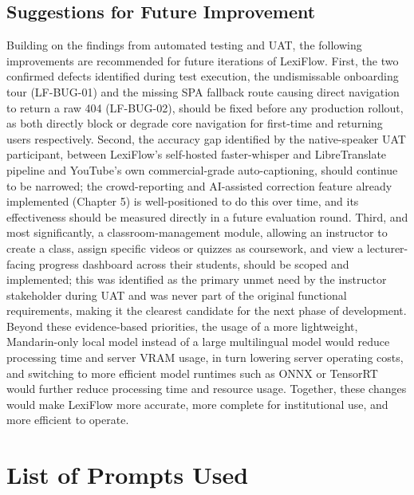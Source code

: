 \documentclass[oneside]{utmthesis}
\begin{document}
\section{Suggestions for Future Improvement}
Building on the findings from automated testing and UAT, the following improvements are recommended for future iterations of LexiFlow. First, the two confirmed defects identified during test execution, the undismissable onboarding tour (LF-BUG-01) and the missing SPA fallback route causing direct navigation to return a raw 404 (LF-BUG-02), should be fixed before any production rollout, as both directly block or degrade core navigation for first-time and returning users respectively. Second, the accuracy gap identified by the native-speaker UAT participant, between LexiFlow's self-hosted faster-whisper and LibreTranslate pipeline and YouTube's own commercial-grade auto-captioning, should continue to be narrowed; the crowd-reporting and AI-assisted correction feature already implemented (Chapter 5) is well-positioned to do this over time, and its effectiveness should be measured directly in a future evaluation round. Third, and most significantly, a classroom-management module, allowing an instructor to create a class, assign specific videos or quizzes as coursework, and view a lecturer-facing progress dashboard across their students, should be scoped and implemented; this was identified as the primary unmet need by the instructor stakeholder during UAT and was never part of the original functional requirements, making it the clearest candidate for the next phase of development. Beyond these evidence-based priorities, the usage of a more lightweight, Mandarin-only local model instead of a large multilingual model would reduce processing time and server VRAM usage, in turn lowering server operating costs, and switching to more efficient model runtimes such as ONNX or TensorRT would further reduce processing time and resource usage. Together, these changes would make LexiFlow more accurate, more complete for institutional use, and more efficient to operate.


\appendix
\chapter{List of Prompts Used}

\end{document}
